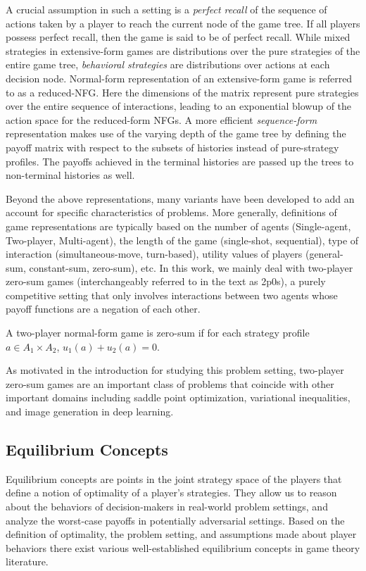 A crucial assumption in such a setting is a \textit{perfect recall} of the sequence of actions
taken by a player to reach the current node of the game tree.
If all players possess perfect recall, then the game is said to be of perfect recall.
While mixed strategies in extensive-form games are distributions over the pure strategies of the
entire game tree, \textit{behavioral strategies} are distributions over actions at each decision
node.
Normal-form representation of an extensive-form game is referred to as a reduced-NFG.
Here the dimensions of the matrix represent pure strategies over the entire sequence of
interactions, leading to an exponential blowup of the action space for the reduced-form NFGs.
A more efficient \textit{sequence-form} representation makes use of the varying depth of the game
tree by defining the payoff matrix with respect to the subsets of histories instead of
pure-strategy profiles.
The payoffs achieved in the terminal histories are passed up the trees to non-terminal histories as
well.

Beyond the above representations, many variants have been developed to add an account for specific
characteristics of problems.
More generally, definitions of game representations are typically based on the number of agents
(Single-agent, Two-player, Multi-agent), the length of the game (single-shot, sequential), type of
interaction (simultaneous-move, turn-based), utility values of players (general-sum, constant-sum,
zero-sum), etc. In this work, we mainly deal with two-player zero-sum games (interchangeably
referred to in the text as 2p0s), a purely competitive setting that only involves interactions
between two agents whose payoff functions are a negation of each other.
\begin{definition}
	A two-player normal-form game is zero-sum if for each strategy profile $a \in A_1 \times A_2$,
	$u_1(a) + u_2(a) = 0$.
\end{definition}
As motivated in the introduction for studying this problem setting, two-player zero-sum games are
an important class of problems that coincide with other important domains including saddle point
optimization, variational inequalities, and image generation in deep learning.

\subsection{Equilibrium Concepts}
Equilibrium concepts are points in the joint strategy space of the players that define a notion of
optimality of a player's strategies.
They allow us to reason about the behaviors of decision-makers in real-world problem settings, and
analyze the worst-case payoffs in potentially adversarial settings.
Based on the definition of optimality, the problem setting, and assumptions made about player
behaviors there exist various well-established equilibrium concepts in game theory literature.

